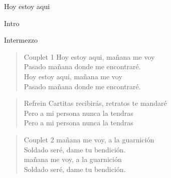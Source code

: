 \begin{song}[huayno]{Hoy estoy aqui}

\begin{instrumental}{Intro}
\measure{}\measure{}\measure{}\measure{}\measure{}
\measure{}\measure{}\measure{}\measure{}\measure{}
\measure{}
\end{instrumental}

\begin{instrumental}{Intermezzo}
\measure{}\measure{}\measure{}\measure{}\measure{}\measure{}\measure{}
\measure{}\measure{}\measure{}\measure{}\measure{}\measure{}\measure{}\measure{}
\measure{}\measure{}
\measure{}\measure{}
\end{instrumental}

\begin{verse}{Couplet 1}
Hoy estoy aqui, ma\~{n}ana me voy\\
Pasado ma\~{n}ana donde me encontraré.\\
Hoy estoy aqui, ma\~{n}ana me voy\\
Pasado ma\~{n}ana donde me encontraré.\phantom{xxxx}\phantom{xxx}\phantom{xxxx}\phantom{xxx}
\end{verse}

\begin{verse}{Refrein}
Cartitas recibir\'{a}s, \hspace{5em} retratos te mandaré \\
Pero a mi persona nunca la tendras\\
Pero a mi persona nunca la tendras\phantom{xxx}\phantom{xxxx}\phantom{xxx}
\end{verse}
\begin{verse}{Couplet 2}
ma\~{n}ana me voy, a la guarnici\'{o}n\\
Soldado ser\'{e}, dame tu bendici\'{o}n.\\
ma\~{n}ana me voy, a la guarnici\'{o}n\\
Soldado ser\'{e}, dame tu bendici\'{o}n.\phantom{xxxx}\phantom{xxx}\phantom{xxxx}\phantom{xxx}
\end{verse}


\end{song}
